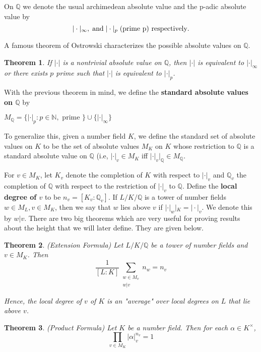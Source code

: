 \documentclass[12pt]{amsart}
\newtheorem{thm}{Theorem}[subsection]
\theoremstyle{definition}
\theoremstyle{remark}
\theoremstyle{definition}
\newcommand{\N}{\mathbb{N}}
\newcommand{\Q}{\mathbb{Q}}
\begin{document}
On $\Q$ we denote the usual archimedean absolute value and the p-adic absolute value by $$|\cdot |_{\infty}, \hspace{1mm} \text{and} \hspace{1mm}  |\cdot |_p\hspace{1mm} \text{(prime p) respectively}.$$

A famous theorem of Ostrowski characterizes the possible absolute values on $\Q$. 

\begin{thm}
If $| \cdot |$ is a nontrivial absolute value on $\Q$, then  $| \cdot |$ is equivalent to  $| \cdot |_{\infty}$ or there exists $p$ prime such that  $| \cdot |$ is equivalent to  $| \cdot |_p$. 
\end{thm}


With the previous theorem in mind, we define the \textbf{standard absolute values on $\Q$} by 

$M_{\Q}=\{  | \cdot |_p : p \in \N, \text{ prime }\} \cup \{ | \cdot |_{\infty}\}$

To generalize this, given a number field $K$, we define the standard set of absolute values on $K$ to be the set of absolute values $M_K$ on $K$ whose restriction to $\Q$  is a standard absolute value on $\Q$ (i.e, $|\cdot|_v \in M_K$ iff $|\cdot|_v|_{\Q} \in M_{\Q}$. 

For $v \in M_K$, let $K_v$ denote the completion of $K$ with respect to  $| \cdot |_v$ and $\Q_v$ the completion of $\Q$ with respect to the restriction of $|\cdot|_v$ to $\Q$. Define the \textbf{local degree of $v$} to be $n_v=[K_v:\Q_v]$. If $L/K/\Q$ is a tower of number fields $w \in M_L, v \in M_K$, then we say that $w$ lies above $v$ if  $| \cdot |_w |_K =  | \cdot |_v$. We denote this by $w|v$. There are two big theorems which are very useful for proving results about the height that we will later define.  They are given below. 


\begin{thm}{(Extension Formula)}
Let $L/K/\Q$ be a tower of number fields and $v\in M_K$. 
Then $$\dfrac{1}{[L:K]} \sum\limits_{\substack{w \in M_v\\ w|v}} n_w=n_v$$ 

Hence, the local degree of $v$ of $K$ is an "average" over local degrees on $L$ that lie above $v$. 

\end{thm}


\begin{thm}{(Product Formula)} Let $K$ be a number field.  
Then for each $\alpha \in K^{\times}$, $$\prod_{v \in M_K} |\alpha |_v^{n_v} =1$$ 
\end{thm}
\end{document}

